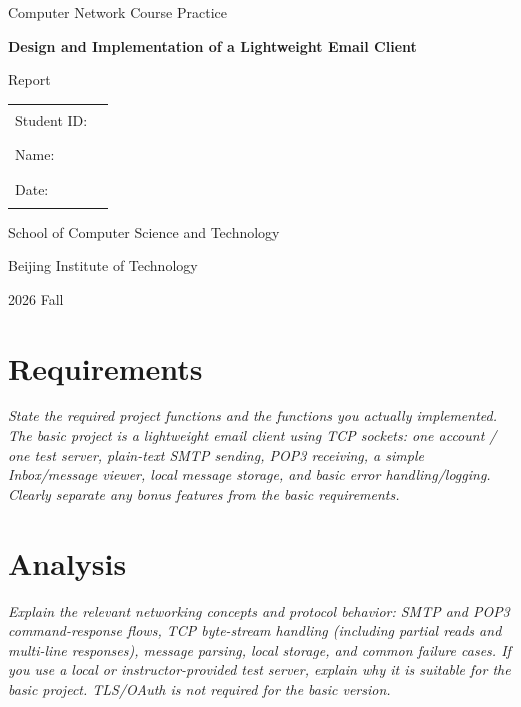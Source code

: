 \documentclass[11pt,a4paper]{article}
\newcommand{\coursename}{Computer Network Course Practice}
\newcommand{\projecttitle}{Design and Implementation of a Lightweight Email Client}
\newcommand{\semester}{2026 Fall}
\newcommand{\schoolname}{School of Computer Science and Technology}
\newcommand{\universityname}{Beijing Institute of Technology}
\newcommand{\studentid}{\rule{7cm}{0.4pt}}
\newcommand{\studentname}{\rule{7cm}{0.4pt}}
\newcommand{\reportdate}{\rule{7cm}{0.4pt}}
\newcommand{\prompt}[1]{\textit{#1}}
\begin{document}
\begin{titlepage}
\centering

\vspace*{2cm}

{\Large \coursename\par}

\vspace{2cm}

{\LARGE\bfseries \projecttitle\par}

\vspace{0.8cm}

{\Large Report\par}

\vfill

\begin{tabular}{ll}
Student ID: & \studentid \\[1em]
Name:       & \studentname \\[1em]
Date:       & \reportdate
\end{tabular}

\vfill

{\schoolname\par}
{\universityname\par}

\vspace{0.8cm}

{\semester\par}

\end{titlepage}

\section{Requirements}
\prompt{State the required project functions and the functions you actually implemented. The basic project is a lightweight email client using TCP sockets: one account / one test server, plain-text SMTP sending, POP3 receiving, a simple Inbox/message viewer, local message storage, and basic error handling/logging. Clearly separate any bonus features from the basic requirements.}

\vspace{3em}

\section{Analysis}
\prompt{Explain the relevant networking concepts and protocol behavior: SMTP and POP3 command-response flows, TCP byte-stream handling (including partial reads and multi-line responses), message parsing, local storage, and common failure cases. If you use a local or instructor-provided test server, explain why it is suitable for the basic project. TLS/OAuth is not required for the basic version.}
\end{document}
